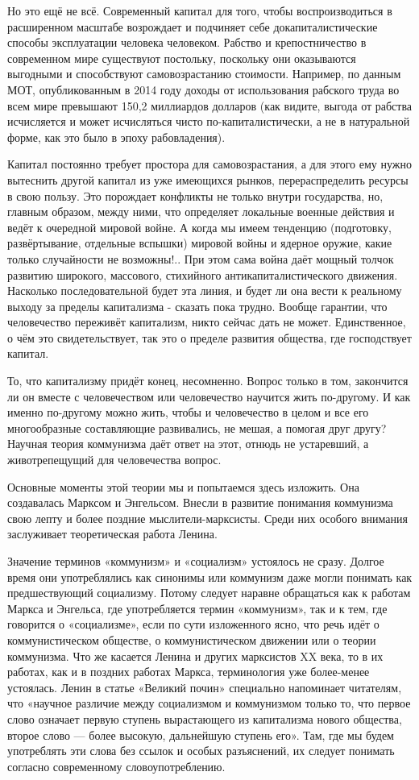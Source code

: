 \documentclass[12pt,a4paper,openany]{book}
\begin{document}
Но это ещё не всё. Современный капитал для того, чтобы воспроизводиться в расширенном масштабе возрождает и подчиняет себе докапиталистические способы эксплуатации человека человеком. Рабство и крепостничество в современном мире существуют постольку, поскольку они оказываются выгодными и способствуют самовозрастанию стоимости. Например, по данным МОТ, опубликованным в 2014 году доходы от использования рабского труда во всем мире превышают 150,2 миллиардов долларов (как видите, выгода от рабства исчисляется и может исчисляться чисто по-капиталистически, а не в натуральной форме, как это было в эпоху рабовладения).

Капитал постоянно требует простора для самовозрастания, а для этого ему нужно вытеснить другой капитал из уже имеющихся рынков, перераспределить ресурсы в свою пользу. Это порождает конфликты не только внутри государства, но, главным образом, между ними, что определяет локальные военные действия и ведёт к очередной мировой войне. А когда мы имеем тенденцию (подготовку, развёртывание, отдельные вспышки) мировой войны и ядерное оружие, какие только случайности не возможны!.. При этом сама война даёт мощный толчок развитию широкого, массового, стихийного антикапиталистического движения. Насколько последовательной будет эта линия, и будет ли она вести к реальному выходу за пределы капитализма - сказать пока трудно. Вообще гарантии, что человечество переживёт капитализм, никто сейчас дать не может. Единственное, о чём это свидетельствует, так это о пределе развития общества, где господствует капитал.

То, что капитализму придёт конец, несомненно. Вопрос только в том, закончится ли он вместе с человечеством или человечество научится жить по-другому. И как именно по-другому можно жить, чтобы и человечество в целом и все его многообразные составляющие развивались, не мешая, а помогая друг другу? Научная теория коммунизма даёт ответ на этот, отнюдь не устаревший, а животрепещущий для человечества вопрос.

Основные моменты этой теории мы и попытаемся здесь изложить. Она создавалась Марксом и Энгельсом. Внесли в развитие понимания коммунизма свою лепту и более поздние мыслители-марксисты. Среди них особого внимания заслуживает теоретическая работа Ленина.

Значение терминов «коммунизм» и «социализм» устоялось не сразу. Долгое время они употреблялись как синонимы или коммунизм даже могли понимать как предшествующий социализму. Потому следует наравне обращаться как к работам Маркса и Энгельса, где употребляется термин «коммунизм», так и к тем, где говорится о «социализме», если по сути изложенного ясно, что речь идёт о коммунистическом обществе, о коммунистическом движении или о теории коммунизма. Что же касается Ленина и других марксистов XX века, то в их работах, как и в поздних работах Маркса, терминология уже более-менее устоялась. Ленин в статье «Великий почин» специально напоминает читателям, что «научное различие между социализмом и коммунизмом только то, что первое слово означает первую ступень вырастающего из капитализма нового общества, второе слово — более высокую, дальнейшую ступень его». Там, где мы будем употреблять эти слова без ссылок и особых разъяснений, их следует понимать согласно современному словоупотреблению.
\end{document}
